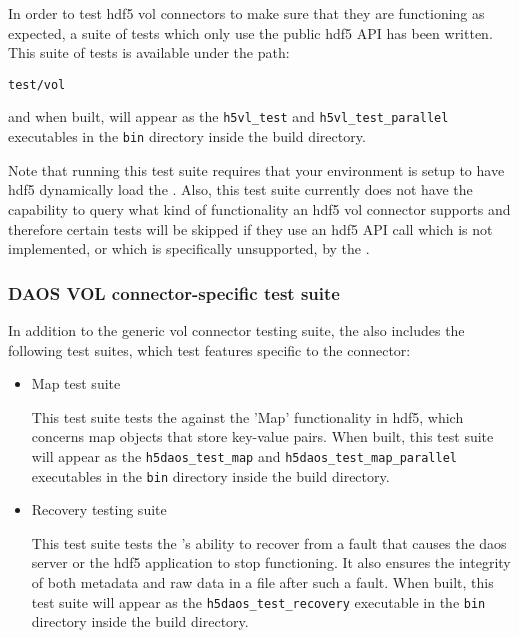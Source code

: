 \documentclass[../users_guide.tex]{subfiles}
\begin{document}
In order to test \acrshort{hdf5} \acrshort{vol} \glspl{connector} to make sure that they are functioning as expected, a suite of tests which only use the public \acrshort{hdf5} API has been written. This suite of tests is available under the path:

\texttt{test/vol}

and when built, will appear as the \texttt{h5vl\_test} and \texttt{h5vl\_test\_parallel} executables in the \texttt{bin} directory inside the build directory.

Note that running this test suite requires that your environment is setup to have \acrshort{hdf5} dynamically load the \dvc{}. Also, this test suite currently does not have the capability to query what kind of functionality an \acrshort{hdf5} \acrshort{vol} \gls{connector} supports and therefore certain tests will be skipped if they use an \acrshort{hdf5} API call which is not implemented, or which is specifically unsupported, by the \dvc.

\subsubsection{DAOS VOL connector-specific test suite}

In addition to the generic \acrshort{vol} \gls{connector} testing suite, the \dvc{} also includes the following test suites, which test features specific to the \gls{connector}:

\begin{itemize}
    \item \dvc{} Map test suite

    This test suite tests the \dvc{} against the 'Map' functionality in \acrshort{hdf5}, which concerns map objects that store key-value pairs. When built, this test suite will appear as the \texttt{h5daos\_test\_map} and \texttt{h5daos\_test\_map\_parallel} executables in the \texttt{bin} directory inside the build directory.

    \item \dvc{} Recovery testing suite

    This test suite tests the \dvc's ability to recover from a fault that causes the \acrshort{daos} server or the \acrshort{hdf5} application to stop functioning. It also ensures the integrity of both metadata and raw data in a file after such a fault. When built, this test suite will appear as the \texttt{h5daos\_test\_recovery} executable in the \texttt{bin} directory inside the build directory.
\end{itemize}
\end{document}
